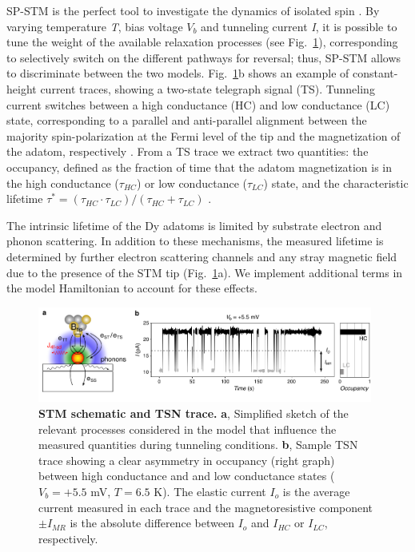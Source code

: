 \documentclass[
reprint,amsmath,amssymb,aps]{revtex4-2}
\begin{document}
SP-STM is the perfect tool to investigate the dynamics of isolated spin \cite{wiesendanger_ObservationVacuumTunneling_1990,Khajetoorians2013,paul_ControlMillisecondSpin_2017,Natterer2017,Natterer2018}. By varying temperature \textit{T}, bias voltage $V_b$ and tunneling current \textit{I}, it is possible to tune the weight of the available relaxation processes (see Fig.~\ref{fig:no_tip_tip_telegraph}), corresponding to selectively switch on the different pathways for reversal; thus, SP-STM allows to discriminate between the two models. 
Fig.~\ref{fig:no_tip_tip_telegraph}b shows an example of constant-height current traces, showing a two-state
telegraph signal (TS). Tunneling current switches between a high conductance (HC) and low conductance (LC) state, corresponding to a parallel and anti-parallel alignment between the majority spin-polarization at the Fermi level of the tip and the magnetization of the adatom, respectively \cite{delgado2010,paul_ControlMillisecondSpin_2017}. From a TS trace we extract two quantities: the occupancy, defined as the fraction of time that the adatom magnetization is in the high conductance ($\tau_{HC}$) or low conductance ($\tau_{LC}$) state, and the characteristic lifetime $\tau ^*=(\tau_{HC}  \cdot \tau_{LC})/( \tau_{HC} + \tau_{LC})$ \cite{Khajetoorians2013}. 

The intrinsic lifetime of the Dy adatoms is limited by substrate electron and phonon scattering. In addition to these mechanisms, the measured lifetime is determined by further electron scattering channels and any stray magnetic field due to the presence of the STM tip (Fig.~\ref{fig:no_tip_tip_telegraph}a). We implement additional terms in the model Hamiltonian to account for these effects. 

\begin{figure}[ht!]
\includegraphics[width=0.98\textwidth]{Fig2_new.pdf}
\caption{\textbf{STM schematic and TSN trace.} \textbf{a}, Simplified sketch of the relevant processes considered in the model that influence the measured quantities during tunneling conditions. \textbf{b}, Sample TSN trace showing a clear asymmetry in occupancy (right graph) between high conductance and and low conductance states ($V_{b} = +5.5$ mV, $T = 6.5$ K). The elastic current $I_{o}$ is the average current measured in each trace and the magnetoresistive component $\pm I_{MR}$ is the absolute difference between $I_{o}$ and $I_{HC}$ or $I_{LC}$, respectively.
\label{fig:no_tip_tip_telegraph} }
\end{figure}
\end{document}
